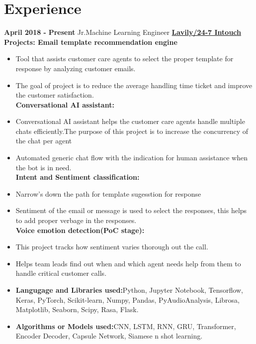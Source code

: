 \documentclass[letterpaper]{twentysecondcv} %
\begin{document}
\section{Experience}
 \vspace{-0.2cm}
\begin{twenty} %
\twentyitem
    	{\bf April 2018 - }
		{\bf Present}
        {\large  Jr.Machine Learning Engineer}
        {\href{https://laivly.com/}{\bf \large Lavily/24-7 Intouch}}
        {\textbf{Projects: Email template recommendation engine}}
        {\begin{itemize}
       	\vspace{-0.4cm}
        \item Tool that assists customer care agents to select the proper template for response by analyzing customer emails.
        \item The goal of project is to reduce the average handling time ticket and improve the customer satisfaction.\\ 
        \textbf{Conversational AI assistant:}
        \item Conversational AI assistant helps the customer care agents handle multiple chats efficiently.The purpose of this project is to increase the concurrency of the chat per agent
        \item Automated generic chat flow with the indication for human assistance when the bot is in need.\\
        \textbf{Intent and Sentiment classification:}
        \item Narrow's down the path for template sugesstion for response
        \item Sentiment of the email or message is used to select the responses, this helps to add proper verbage in the responses.\\
        \textbf{Voice emotion detection(PoC stage):}
        \item This project tracks how sentiment varies thorough out the call. 
        \item Helps team leads find out when and which agent needs help from them to handle critical customer calls.
        \item \textbf{Langugage and Libraries used:}Python, Jupyter Notebook, Tensorflow, Keras, PyTorch, Scikit-learn, Numpy, Pandas, PyAudioAnalysis, Librosa, Matplotlib, Seaborn, Scipy, Rasa, Flask. 
        \item \textbf{Algorithms or Models used:}CNN, LSTM, RNN, GRU, Transformer, Encoder Decoder, Capsule Network, Siamese n shot learning.\\

\end{itemize}}
\end{twenty}
\end{document}
